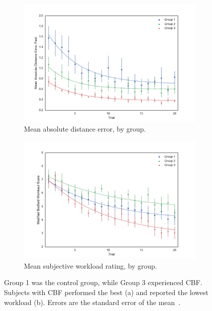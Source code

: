 \documentclass[float=false, crop=false]{standalone}
\begin{document}
\begin{figure}[tb!]
    \begin{center}
        \begin{subfigure}{0.49\textwidth}
            \includegraphics[width=\linewidth]{./../img/Group_absDistErr_clean_fit_30.pdf}
            \caption{Mean absolute distance error, by group.}
            \label{figure:saferdistance}
        \end{subfigure}\hfill
        \begin{subfigure}{0.49\textwidth}
            \includegraphics[width=\linewidth]{./../img/Group_Workload_fit_30.pdf}
            \caption{Mean subjective workload rating, by group.}
            \label{figure:saferworkload}
        \end{subfigure}
        \caption{Group 1 was the control group, while Group 3 experienced CBF. Subjects with CBF performed the best (a) and reported the lowest workload (b). Errors are the standard error of the mean~\cite{Karasinski2016Masters}.}
    \end{center}
\end{figure}
\end{document}
